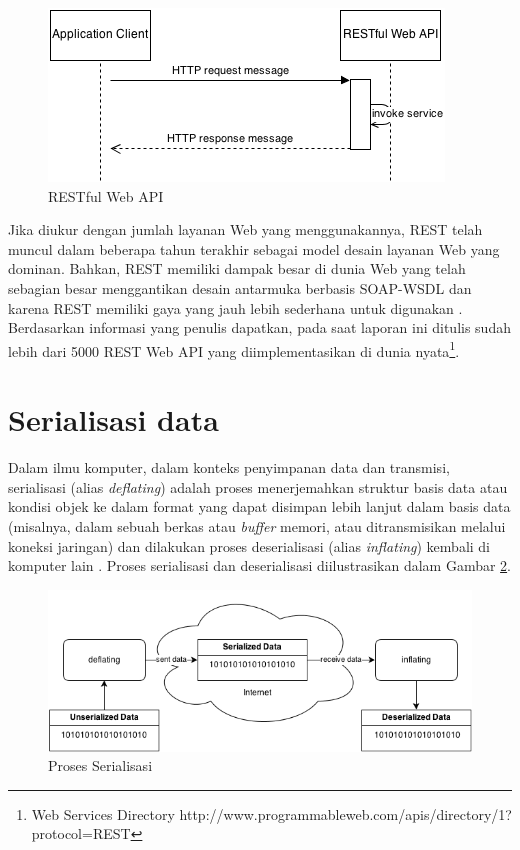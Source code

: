 \documentclass[a4paper, 12pt]{report}
\begin{document}
\onehalfspacing
\begin{figure}[htp]
\centering
\includegraphics[scale=1.00]{images/RESTful-web-api.png}
\caption{RESTful Web API}
\label{RESTful Web API}
\end{figure}

\onehalfspacing Jika diukur dengan jumlah layanan Web yang menggunakannya, REST telah muncul dalam beberapa tahun terakhir sebagai model desain layanan Web yang dominan. Bahkan, REST memiliki dampak besar di dunia Web yang telah sebagian besar menggantikan desain antarmuka berbasis SOAP-WSDL dan karena REST memiliki gaya yang jauh lebih sederhana untuk digunakan \cite{ws-restful}. Berdasarkan informasi yang penulis dapatkan, pada saat laporan ini ditulis sudah lebih dari 5000 REST Web API yang diimplementasikan di dunia nyata\footnote{Web Services Directory http://www.programmableweb.com/apis/directory/1?protocol=REST}.

\section{Serialisasi data}

\onehalfspacing Dalam ilmu komputer, dalam konteks penyimpanan data dan transmisi, serialisasi (alias \textit{deflating}) adalah proses menerjemahkan struktur basis data atau kondisi objek ke dalam format yang dapat disimpan lebih lanjut dalam basis data (misalnya, dalam sebuah berkas atau \textit{buffer} memori, atau ditransmisikan melalui koneksi jaringan) dan dilakukan proses deserialisasi (alias \textit{inflating}) kembali di komputer lain \cite{serialization-wikipedia}. Proses serialisasi dan deserialisasi diilustrasikan dalam Gambar \ref{Proses Serialisasi}.

\onehalfspacing 
\begin{figure}[htp]
\centering
\includegraphics[scale=0.65]{images/serialization-process.png}
\caption{Proses Serialisasi}
\label{Proses Serialisasi}
\end{figure}
\end{document}

